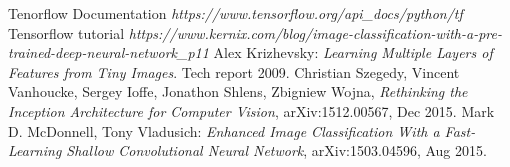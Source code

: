 \documentclass{article}
\begin{document}
\begin{thebibliography}{1}

 Tenorflow Documentation {\em https://www.tensorflow.org/api\_docs/python/tf}
 Tensorflow tutorial {\em https://www.kernix.com/blog/image-classification-with-a-pre-trained-deep-neural-network\_p11}
 Alex Krizhevsky: {\em Learning Multiple Layers of Features from Tiny Images}. Tech report 2009.
 Christian Szegedy, Vincent Vanhoucke, Sergey Ioffe, Jonathon Shlens, Zbigniew Wojna, {\em Rethinking the Inception Architecture for Computer Vision},  arXiv:1512.00567, Dec 2015.
 Mark D. McDonnell, Tony Vladusich: {\em Enhanced Image Classification With a Fast-Learning Shallow Convolutional Neural Network},  	arXiv:1503.04596, Aug 2015.
  

\end{thebibliography}
\end{document}

